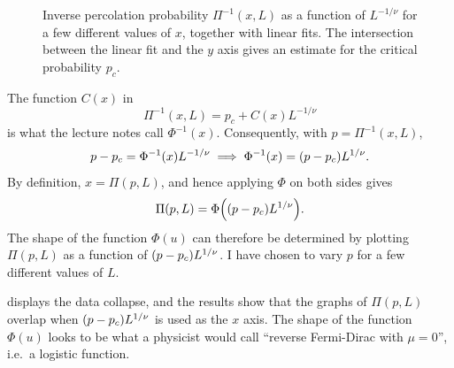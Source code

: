 \documentclass[11pt,british,a4paper]{report}
\begin{document}
\begin{figure}[H]
    \caption{Inverse percolation probability \(\Pi^{-1}(x,L)\) as a function of \(L^{-1/\nu}\) for a few different values of \(x\), together with linear fits. The intersection between the linear fit and the \(y\) axis gives an estimate for the critical probability \(p_c\).}%
    \label{fig:n1}
\end{figure}
The function \(C(x)\) in
\begin{equation}
    \Pi^{-1}(x,L) = p_c + C(x)L^{-1/\nu}
\end{equation}
is what the lecture notes call \(\Phi^{-1}(x)\). Consequently, with \(p=\Pi^{-1}(x,L)\),
\begin{equation}
    p - p_c = \Phi^{-1}(x) L^{-1/\nu} \implies \Phi^{-1}(x) = \qty(p-p_c)L^{1/\nu}.
\end{equation}
By definition, \(x=\Pi(p,L)\), and hence applying \(\Phi\) on both sides gives
\begin{equation}
    \Pi(p,L) = \Phi\qty(\qty(p-p_c)L^{1/\nu}).
\end{equation}
The shape of the function \(\Phi(u)\) can therefore be determined by plotting \(\Pi(p,L)\) as a function of \(\qty(p-p_c)L^{1/\nu}\). I have chosen to vary \(p\) for a few different values of \(L\).

 displays the data collapse, and the results show that the graphs of \(\Pi(p,L)\) overlap when \(\qty(p-p_c)L^{1/\nu}\) is used as the \(x\) axis. The shape of the function \(\Phi(u)\) looks to be what a physicist would call ``reverse Fermi-Dirac with \(\mu=0\)'', i.e.\ a logistic function.
\end{document}

